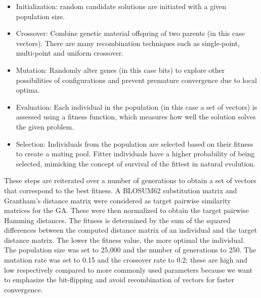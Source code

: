 \begin{itemize}
    \item Initialization: random candidate solutions are initiated with a given population size.
    \item Crossover: Combine genetic material offspring of two parents (in this case vectors). There are many recombination techniques such as single-point, multi-point and uniform crossover.
    \item Mutation: Randomly alter genes (in this case bits) to explore other possibilities of configurations and prevent premature convergence due to local optima.
    \item Evaluation: Each individual in the population (in this case a set of vectors) is assessed using a fitness function, which measures how well the solution solves the given problem.
    \item Selection: Individuals from the population are selected based on their fitness to create a mating pool. Fitter individuals have a higher probability of being selected, mimicking the concept of survival of the fittest in natural evolution.
\end{itemize}
These steps are reiterated over a number of generations to obtain a set of vectors that correspond to the best fitness. A BLOSUM62 substitution matrix \cite{blosum} and Grantham's distance matrix \cite{aa_evolution} were considered as target pairwise similarity matrices for the GA. These were then normalized to obtain the target pairwise Hamming distances. The fitness is determined by the sum of the squared differences between the computed distance matrix of an individual and the target distance matrix. The lower the fitness value, the more optimal the individual. The population size was set to 25,000 and the number of generations to 250. The mutation rate was set to 0.15 and the crossover rate to 0.2; these are high and low respectively compared to more commonly used parameters because we want to emphasize the bit-flipping and avoid recombination of vectors for faster convergence.
